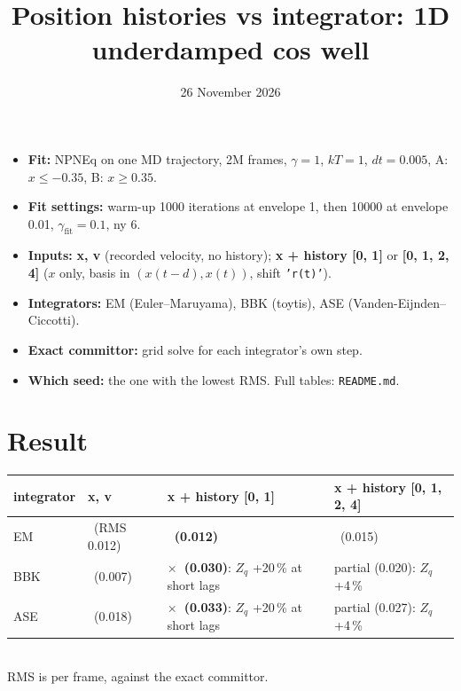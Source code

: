 \documentclass[10pt]{article}
\title{\vspace{-1.2cm}Position histories vs integrator: 1D underdamped cos well}
\date{26 November 2026}
\newcommand{\ok}{\textcolor{green!50!black}{\checkmark}}
\newcommand{\no}{\textcolor{red!70!black}{$\times$}}
\begin{document}
\maketitle\vspace{-0.6cm}

\begin{itemize}
\item \textbf{Fit:} NPNEq on one MD trajectory, 2M frames, $\gamma=1$, $kT=1$, $dt=0.005$, A: $x\le-0.35$, B: $x\ge0.35$.
\item \textbf{Fit settings:} warm-up 1000 iterations at envelope 1, then 10000 at envelope 0.01, $\gamma_\mathrm{fit}=0.1$, ny 6.
\item \textbf{Inputs:} \textbf{x, v} (recorded velocity, no history); \textbf{x + history [0, 1]} or \textbf{[0, 1, 2, 4]}
  ($x$ only, basis in $(x(t-d), x(t))$, shift \texttt{'r(t)'}).
\item \textbf{Integrators:} EM (Euler--Maruyama), BBK (toytis), ASE (Vanden-Eijnden--Ciccotti).
\item \textbf{Exact committor:} grid solve for each integrator's own step.
\item \textbf{Which seed:} the one with the lowest RMS. Full tables: \texttt{README.md}.
\end{itemize}

\section*{Result}
\begin{center}
\begin{tabular}{llll}
\toprule
integrator & x, v & x + history [0, 1] & x + history [0, 1, 2, 4] \\
\midrule
EM  & \ok\ (RMS 0.012) & \textbf{\ok\ (0.012)} & \ok\ (0.015) \\
BBK & \ok\ (0.007) & \textbf{\no\ (0.030)}: $Z_q$ +20\,\% at short lags & partial (0.020): $Z_q$ +4\,\% \\
ASE & \ok\ (0.018) & \textbf{\no\ (0.033)}: $Z_q$ +20\,\% at short lags & partial (0.027): $Z_q$ +4\,\% \\
\bottomrule
\end{tabular}\\[2pt]
{\small RMS is per frame, against the exact committor.}
\end{center}
\end{document}
